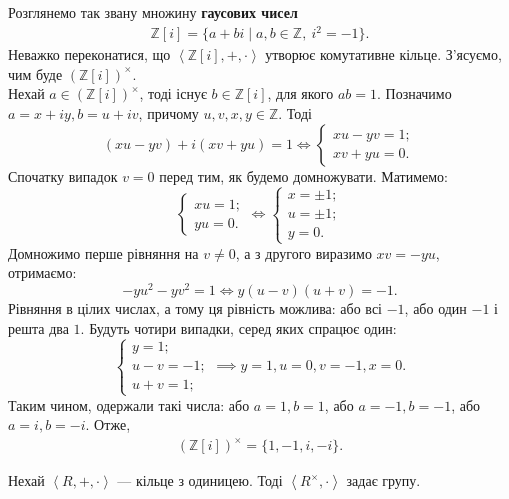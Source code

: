 \documentclass{math_library}
\begin{document}
\begin{example}
Розглянемо так звану множину \textbf{гаусових чисел}
\begin{align*}
\mathbb{Z}[i] = \{ a + bi \mid a,b \in \mathbb{Z},\ i^2 = -1 \}.
\end{align*}
Неважко переконатися, що $\left< \mathbb{Z}[i], +, \cdot \right>$ утворює комутативне кільце. З'ясуємо, чим буде $(\mathbb{Z}[i])^\times$.
\bigskip \\
Нехай $a \in (\mathbb{Z}[i])^\times$, тоді існує $b \in \mathbb{Z}[i]$, для якого $ab = 1$. Позначимо $a = x+iy, b = u+iv$, причому $u,v,x,y \in \mathbb{Z}$. Тоді
\[
(xu-yv) + i(xv+yu) = 1 \iff \begin{cases} xu - yv = 1; \\ xv + yu = 0. \end{cases}
\]
Спочатку випадок $v = 0$ перед тим, як будемо домножувати. Матимемо:
\[
\begin{cases} xu = 1; \\ yu = 0. \end{cases} \iff \begin{cases} x = \pm 1; \\ u = \pm 1; \\ y = 0. \end{cases}
\]
Домножимо перше рівняння на $v \neq 0$, а з другого виразимо $xv = -yu$, отримаємо:
\[
-yu^2 - yv^2 = 1 \iff y(u-v)(u+v) = -1.
\]
Рівняння в цілих числах, а тому ця рівність можлива: або всі $-1$, або один $-1$ і решта два $1$. Будуть чотири випадки, серед яких спрацює один:
\[
\begin{cases} 
y = 1; \\
u - v = -1; \\
u + v = 1;
\end{cases} \implies y = 1, u = 0, v = -1, x = 0.
\]
Таким чином, одержали такі числа: або $a = 1, b = 1$, або $a = -1, b = -1$, або $a = i, b = -i$. Отже,
\begin{align*}
(\mathbb{Z}[i])^\times = \{1,-1,i,-i\}.
\end{align*}
\end{example}

\begin{theorem}
Нехай $\left<R,+,\cdot \right>$ --- кільце з одиницею. Тоді $\left<R^\times, \cdot \right>$ задає групу.
\end{theorem}
\end{document}
